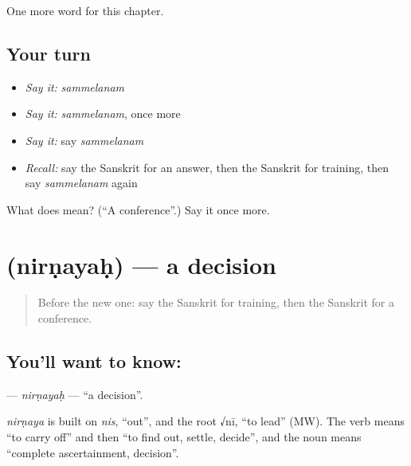 \begin{grammarlens}[title={What you've built}]
One more word for this chapter.
\end{grammarlens}

\subsection*{Your turn}
\begin{itemize}
\raggedright
  \item \emph{Say it:} \emph{sammelanam}
  \item \emph{Say it:} \emph{sammelanam}, once more
  \item \emph{Say it:} say \emph{sammelanam}
  \item \emph{Recall:} say the Sanskrit for an answer, then the Sanskrit for training, then say \emph{sammelanam} again
\end{itemize}

\begin{tcolorbox}[breakable,colback=teal!4,colframe=teal!35!black,title={Before you move on}]
What does  mean? (\textquotedblleft{}A conference\textquotedblright{}.) Say it once more.
\end{tcolorbox}
\section[\texorpdfstring{\sk{निर्णयः} (nirṇayaḥ)}{निर्णयः (nirṇayaḥ)}]{ (nirṇayaḥ) — a decision}

\label{lesson:SA-C256-nirnayah}



\begin{quote}
Before the new one: say the Sanskrit for training, then the Sanskrit for a conference.
\end{quote}

\subsection*{You'll want to know: }
\textbf{} — \emph{nirṇayaḥ} — \textquotedblleft{}a decision\textquotedblright{}.

\begin{cousinweb}
\emph{nirṇaya} is built on \emph{nis}, \textquotedblleft{}out\textquotedblright{}, and the root √nī, \textquotedblleft{}to lead\textquotedblright{} (MW). The verb means \textquotedblleft{}to carry off\textquotedblright{} and then \textquotedblleft{}to find out, settle, decide\textquotedblright{}, and the noun means \textquotedblleft{}complete ascertainment, decision\textquotedblright{}.
\end{cousinweb}

